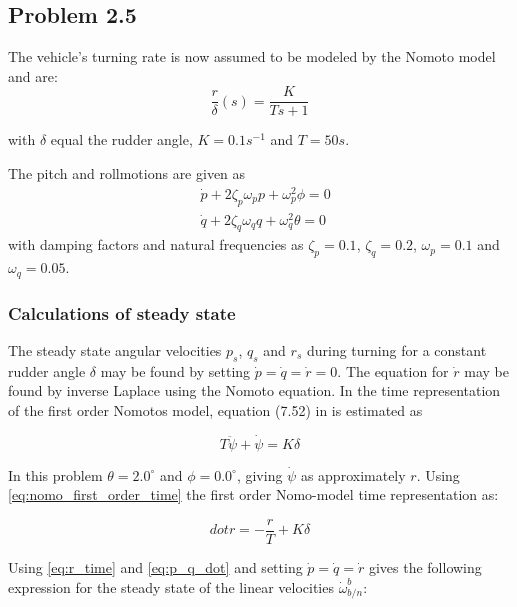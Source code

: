 \subsection*{Problem 2.5}

The vehicle's turning rate is now assumed to be modeled by the Nomoto model and are:
\begin{equation}
	\frac{r}{\delta} (s) = \frac{K}{Ts+1}
\end{equation}

with $\delta$ equal the rudder angle, $K =0.1 s^{-1}$ and $T = 50s$.

The pitch and rollmotions are given as
\begin{equation}
\begin{aligned}
	&\dot{p} + 2\zeta_p\omega_p p + \omega_p^2 \phi = 0\\
	&\dot{q} + 2\zeta_q\omega_q q + \omega_q^2 \theta = 0
	\label{eq:p_q_dot}
\end{aligned}
\end{equation}
with damping factors and natural  frequencies as $\zeta_p = 0.1 $, $\zeta_q = 0.2 $, $\omega_p = 0.1 $ and $\omega_q = 0.05 $. 

\subsubsection*{Calculations of steady state}

The steady state angular velocities $p_s$, $q_s$ and $r_s$ during turning for a constant rudder angle $\delta$ may be found by setting $\dot{p}= \dot{q} = \dot{r} = 0$. The equation for $\dot{r}$ may be found by inverse Laplace using the Nomoto equation. In \cite{Fossen2011} the time representation of the first order Nomotos model, equation (7.52) in \cite{Fossen2011} is estimated as 

\begin{equation}
    T\ddot{\psi} + \dot{\psi} = K \delta
    \label{eq:nomo_first_order_time}
\end{equation}

In this problem $\theta = 2.0 ^\circ$ and $\phi = 0.0 ^\circ$, giving $\dot{\psi}$ as approximately $r$. Using \eqref{eq:nomo_first_order_time} the  first order Nomo-model time representation as:

\begin{equation}
    dot{r} = - \frac{r}{T} +  K \delta
    \label{eq:r_time}
\end{equation}

Using \eqref{eq:r_time} and \eqref{eq:p_q_dot} and setting $\dot{p} =\dot{q} = \dot{r}$ gives the following expression for the steady state of the linear velocities $\dot{\omega}^b_{b/n}$:

